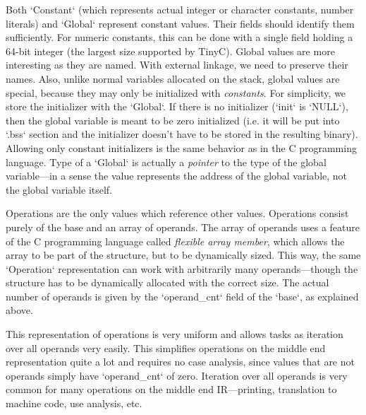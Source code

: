 Both `Constant` (which represents actual integer or character constants, number
literals) and `Global` represent constant values. Their fields should identify
them sufficiently. For numeric constants, this can be done with a single field
holding a 64-bit integer (the largest size supported by TinyC). Global values
are more interesting as they are named. With external linkage, we need to
preserve their names. Also, unlike normal variables allocated on the stack,
global values are special, because they may only be initialized with {\em
constants}. For simplicity, we store the initializer with the `Global`. If there
is no initializer (`init` is `NULL`), then the global variable is meant to be
zero initialized (i.e. it will be put into `.bss` section and the initializer
doesn't have to be stored in the resulting binary). Allowing only constant
initializers is the same behavior as in the C programming language. Type of a `Global` is actually a {\em
pointer} to the type of the global variable---in a sense the value represents the address
of the global variable, not the global variable itself.

Operations are the only values which reference other values. Operations consist
purely of the base and an array of operands. The array of operands uses a
feature of the C programming language called {\em flexible array member}, which
allows the array to be part of the structure, but to be dynamically sized. This
way, the same `Operation` representation can work with arbitrarily many
operands---though the structure has to be dynamically allocated with the correct
size. The actual number of operands is given by the `operand_cnt` field of the
`base`, as explained above.

This representation of operations is very uniform and allows tasks as iteration
over all operands very easily. This simplifies operations on the middle end
representation quite a lot and requires no case analysis, since values that are
not operands simply have `operand_cnt` of zero. Iteration over all operands is
very common for many operations on the middle end IR---printing, translation to
machine code, use analysis, etc.

